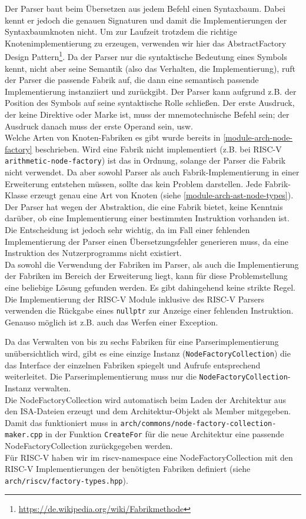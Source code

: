 Der Parser baut beim Übersetzen aus jedem Befehl einen Syntaxbaum. Dabei kennt er jedoch die genauen Signaturen und damit die Implementierungen der
Syntaxbaumknoten nicht. Um zur Laufzeit trotzdem die richtige
Knotenimplementierung zu erzeugen, verwenden wir hier das
AbstractFactory Design Pattern\footnote{\url{https://de.wikipedia.org/wiki/Fabrikmethode}}. Da
der Parser nur die syntaktische Bedeutung eines Symbols kennt, nicht aber seine
Semantik (also das Verhalten, die Implementierung), ruft der Parser die passende
Fabrik auf, die dann eine semantisch passende Implementierung instanziiert und
zurückgibt. Der Parser kann aufgrund z.B. der Position des Symbols auf seine
syntaktische Rolle schließen. Der erste Ausdruck, der keine Direktive oder Marke
ist, muss der mnemotechnische Befehl sein; der Ausdruck danach muss der erste
Operand sein, usw. \\
Welche Arten von Knoten-Fabriken es gibt wurde bereits in
\autoref{module-arch-node-factory} beschrieben. Wird eine Fabrik nicht
implementiert (z.B. bei RISC-V \texttt{arithmetic-node-factory}) ist das in
Ordnung, solange der Parser die Fabrik nicht verwendet. Da aber sowohl Parser
als auch Fabrik-Implementierung in einer Erweiterung entstehen müssen, sollte
das kein Problem darstellen. Jede Fabrik-Klasse erzeugt genau eine Art von
Knoten (siehe \autoref{module-arch-ast-node-types}).\\

Der Parser hat wegen der Abstraktion, die eine Fabrik bietet, keine Kenntnis
darüber, ob eine Implementierung einer bestimmten Instruktion vorhanden ist. Die
Entscheidung ist jedoch sehr wichtig, da im Fall einer fehlenden Implementierung
der Parser einen Übersetzungsfehler generieren muss, da eine Instruktion des
Nutzerprogramms nicht existiert.\\
Da sowohl die Verwendung der Fabriken im Parser, als auch die Implementierung
der Fabriken im Bereich der Erweiterung liegt, kann für diese Problemstellung
eine beliebige Lösung gefunden werden. Es gibt dahingehend keine strikte
Regel.\\
Die Implementierung der RISC-V Module inklusive des RISC-V Parsers verwenden die
Rückgabe eines \texttt{nullptr} zur Anzeige einer fehlenden Instruktion. Genauso
möglich ist z.B. auch das Werfen einer Exception.

Da das Verwalten von bis zu sechs Fabriken für eine Parserimplementierung
unübersichtlich wird, gibt es eine einzige Instanz
(\texttt{NodeFactoryCollection}) die das Interface der einzelnen Fabriken
spiegelt und Aufrufe entsprechend weiterleitet. Die Parserimplementierung muss
nur die \texttt{NodeFactoryCollection}-Instanz verwalten.\\
Die NodeFactoryCollection wird automatisch beim Laden der Architektur aus den
ISA-Dateien erzeugt und dem Architektur-Objekt als Member mitgegeben. Damit das
funktioniert muss in \texttt{arch/commons/node-factory-collection-maker.cpp} in
der Funktion \texttt{CreateFor} für die neue Architektur eine passende
NodeFactoryCollection zurückgegeben werden.\\
Für RISC-V haben wir im riscv-namespace eine NodeFactoryCollection mit den
RISC-V Implementierungen der benötigten Fabriken definiert (siehe
\texttt{arch/riscv/factory-types.hpp}).

